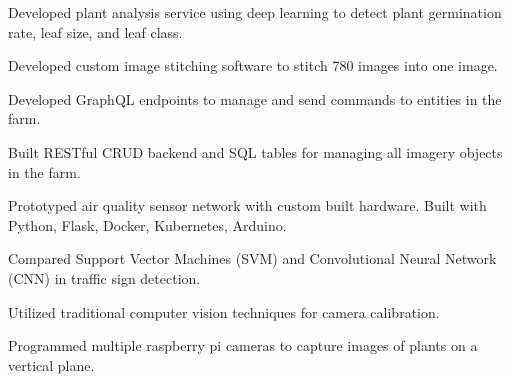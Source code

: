\documentclass[]{deedy-resume-openfont}
\begin{document}
\vspace{-4pt}
\begin{tightemize}%


\item Developed plant analysis service using deep learning to detect plant germination rate, leaf size, and leaf class.
\item Developed custom image stitching software to stitch 780 images into one image.
\item Developed GraphQL endpoints to manage and send commands to entities in the farm.
\item Built RESTful CRUD backend and SQL tables for managing all imagery objects in the farm.

\end{tightemize}
\sectionsep

\hfill{}

\vspace{-4pt}
\begin{tightemize}%

\item Prototyped air quality sensor network with custom built hardware. Built with Python, Flask, Docker, Kubernetes, Arduino.
\item Compared Support Vector Machines (SVM) and Convolutional Neural Network (CNN) in traffic sign detection.


\end{tightemize}
\sectionsep

\hfill{}

\vspace{-4pt}
\begin{tightemize}
\item Utilized traditional computer vision techniques for camera calibration.
\item Programmed multiple raspberry pi cameras to capture images of plants on a vertical plane.
\end{tightemize}
\sectionsep
\end{document}
